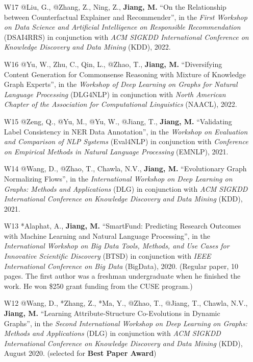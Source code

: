 \documentclass[10pt]{article}
\newenvironment{myindentpar}[1]%
{\begin{list}{}%
         {\setlength{\leftmargin}{#1}}%
         \item[]%
}
{\end{list}}
\newcounter{list}
\begin{document}
\begin{myindentpar}{0.00cm}
\begin{enumerate}[leftmargin=.5cm]
\item[W17] @Liu, G., @Zhang, Z., Ning, Z., \textbf{Jiang, M.} ``On the Relationship between Counterfactual Explainer and Recommender'', in the \textit{First Workshop on Data Science and Artificial Intelligence on Responsible Recommendation} (DSAI4RRS) in conjunction with \textit{ACM SIGKDD International Conference on Knowledge Discovery and Data Mining} (KDD), 2022.

\item[W16] @Yu, W., Zhu, C., Qin, L., @Zhao, T., \textbf{Jiang, M.} ``Diversifying Content Generation for Commonsense Reasoning with Mixture of Knowledge Graph Experts'', in the \textit{Workshop of Deep Learning on Graphs for Natural Language Processing} (DLG4NLP) in conjunction with \textit{North American Chapter of the Association for Computational Linguistics} (NAACL), 2022.
		
\item[W15] @Zeng, Q., @Yu, M., @Yu, W., @Jiang, T., \textbf{Jiang, M.} ``Validating Label Consistency in NER Data Annotation'', in the \textit{Workshop on Evaluation and Comparison of NLP Systems} (Eval4NLP) in conjunction with \textit{Conference on Empirical Methods in Natural Language Processing} (EMNLP), 2021.

\item[W14] @Wang, D., @Zhao, T., Chawla, N.V., \textbf{Jiang, M.} ``Evolutionary Graph Normalizing Flows'', in the \textit{International Workshop on Deep Learning on Graphs: Methods and Applications} (DLG) in conjunction with \textit{ACM SIGKDD International Conference on Knowledge Discovery and Data Mining} (KDD), 2021.

\item[W13] *Alaphat, A., \textbf{Jiang, M.} ``SmartFund: Predicting Research Outcomes with Machine Learning and Natural Language Processing'', in the \textit{International Workshop on Big Data Tools, Methods, and Use Cases for Innovative Scientific Discovery} (BTSD) in conjunction with \textit{IEEE International Conference on Big Data} (BigData), 2020. (Regular paper, 10 pages. The first author was a freshman undergraduate when he finished the work. He won \$250 grant funding from the CUSE program.)

\item[W12] @Wang, D., *Zhang, Z., *Ma, Y., @Zhao, T., @Jiang, T., Chawla, N.V., \textbf{Jiang, M.} ``Learning Attribute-Structure Co-Evolutions in Dynamic Graphs'', in the \textit{Second International Workshop on Deep Learning on Graphs: Methods and Applications} (DLG) in conjunction with \textit{ACM SIGKDD International Conference on Knowledge Discovery and Data Mining} (KDD), August 2020. (selected for \textbf{Best Paper Award})


\end{enumerate}
\end{myindentpar}
\end{document}
